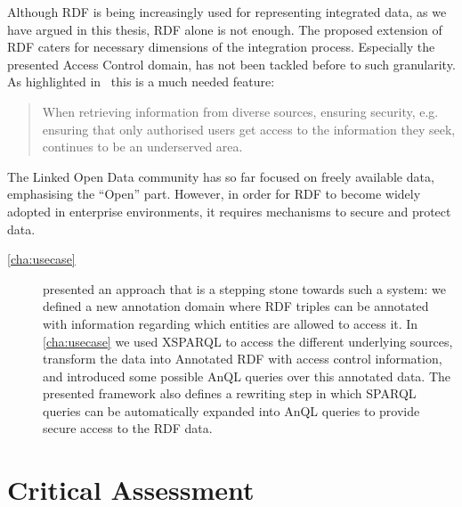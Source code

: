 Although \ac{RDF} is being increasingly used for representing integrated data, as we have argued in this thesis,
\ac{RDF} alone is not enough.
%
The proposed extension of \ac{RDF} caters for necessary dimensions of the integration process.  Especially the presented
Access Control domain, has not been tackled before to such granularity.
%
As highlighted in~\citet{HalevyAshishBitton:2005aa} this is a much needed feature:
\begin{quote}
  When retrieving information from diverse sources, ensuring security, e.g. ensuring that only authorised users get
  access to the information they seek, continues to be an underserved area.
\end{quote}
%
The Linked Open Data community has so far focused on freely available data, emphasising the ``Open'' part.  However, in
order for \ac{RDF} to become widely adopted in enterprise environments, it requires mechanisms to secure and protect
data.  
%
\begin{description}
\item[\cref{cha:usecase}] presented an approach that is a stepping stone towards such a system:
  we defined a new annotation domain where \ac{RDF} triples can be annotated with information regarding which entities
  are allowed to access it.
  In \cref{cha:usecase} we used XSPARQL to access the different underlying sources, transform the data into Annotated
  RDF with access control information, and introduced some possible AnQL queries over this annotated data.
  The presented framework also defines a rewriting step in which SPARQL queries can be automatically expanded into AnQL
  queries to provide secure access to the \ac{RDF} data.
\end{description}




\section{Critical Assessment}
\label{sec:critical-assesment}


